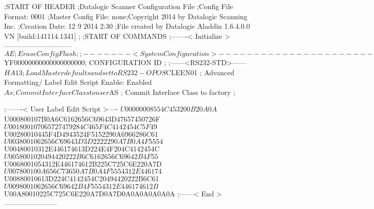 ;START OF HEADER
;Datalogic Scanner Configuration File
;Config File Format: 0001
;Master Config File: none;Copyright 2014 by Datalogic Scanning Inc.
;Creation Date: 12 9 2014 2:30
;File created by Datalogic Aladdin 1.6.4.0.0 VN [build:141114.1341]
;
;START OF COMMANDS
;-------< Initialize >-----------------------------
$AE                 ; Erase Config Flash
;
;-------< System Configuration >-------------------------------
$YF00000000000000000000; CONFIGURATION ID
;
;------<RS232-STD>------
$HA13               ; Load Master defaults and set to RS232-OPOS
$CLEEN01            ; Advanced Formatting/ Label Edit Script Enable: Enabled
$As                 ; Commit Interface Class to user
$AS                 ; Commit Interface Class to factory
;

;-------< User Label Edit Script >----
$U00000008554C453200B20A0A
$U000800107B0A6C6162656C69643D47657450726F
$U001800107065727479284C465F4C4142454C5F49
$U00280010445F4D4943524F5152290A6966286C61
$U0038001062656C69643D3D2222290A7B0A4F5554
$U00480010312E446174613D224E4F204C4142454C
$U0058001020494420222B6C6162656C69642B4F55
$U0068001054312E446174612B225C725C6E220A7D
$U007800100A656C73650A7B0A4F5554312E446174
$U00880010613D224C4142454C20494420222B6C61
$U0098001062656C69642B4F5554312E446174612B
$U00A80010225C725C6E220A7D0A7D0A0A0A0A0A0A
;------< End >-----------------------
